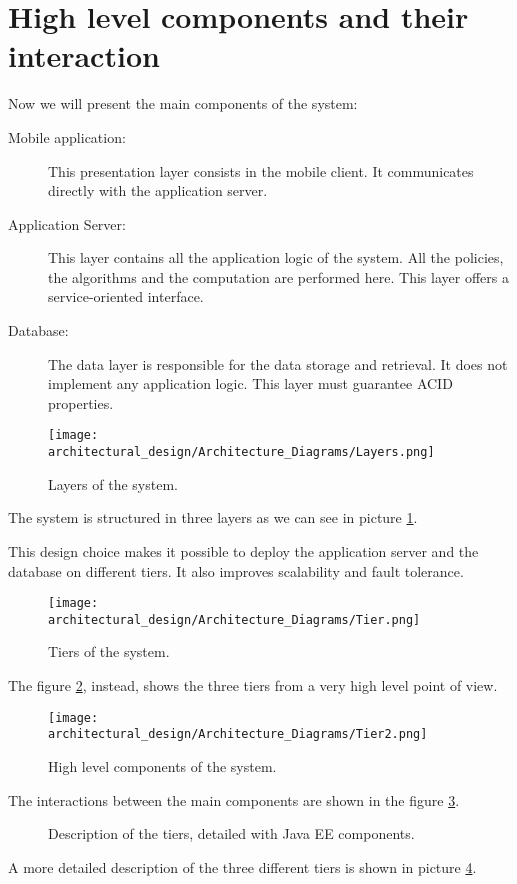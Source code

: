\section{High level components and their interaction}
Now we will present the main components of the system:

\begin{description}
\item[Mobile application:] This presentation layer consists in the mobile client. It communicates directly with the application server.
\item[Application Server:] This layer contains all the application logic of the system. All the policies, the algorithms and the computation are performed here. This layer offers a service-oriented interface.
\item[Database:] The data layer is responsible for the data storage and retrieval. It does not implement any application logic. This layer must guarantee ACID properties. 
\end{description}

\begin{figure}
	\centering
	\texttt{[image: architectural\_design/Architecture\_Diagrams/Layers.png]}
	\caption{Layers of the system.}
	\label{fig:layers}
\end{figure}

The system is structured in three layers as we can see in picture \ref{fig:layers}.

This design choice makes it possible to deploy the application server and the database on different tiers. It also improves scalability and fault tolerance.

\begin{figure}
	\centering
	\texttt{[image: architectural\_design/Architecture\_Diagrams/Tier.png]}
	\caption{Tiers of the system.}
	\label{fig:tiers}
\end{figure}

The figure \ref{fig:tiers}, instead, shows the three tiers from a very high level point of view.

\begin{figure}
	\centering
	\texttt{[image: architectural\_design/Architecture\_Diagrams/Tier2.png]}
	\caption{High level components of the system.}
	\label{fig:high_components}
\end{figure}

The interactions between the main components are shown in the figure \ref{fig:high_components}.

\begin{figure}
    \vspace*{-2cm}
    \caption{Description of the tiers, detailed with Java EE components.}
	\label{fig:tiers_description}
\end{figure}

A more detailed description of the three different tiers is shown in picture \ref{fig:tiers_description}.


